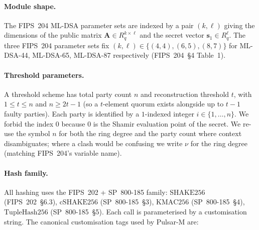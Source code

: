 \documentclass[11pt,a4paper]{article}
\theoremstyle{definition}
\theoremstyle{remark}
\newcommand{\Rq}{R_q}
\newcommand{\SHAKE}{\mathrm{SHAKE256}}
\newcommand{\cSHAKE}{\mathrm{cSHAKE256}}
\newcommand{\KMAC}{\mathrm{KMAC256}}
\newcommand{\TupleHash}{\mathrm{TupleHash256}}
\begin{document}
\paragraph{Module shape.} The FIPS~204 ML-DSA parameter sets are
indexed by a pair $(k, \ell)$ giving the dimensions of the public
matrix $\mathbf{A} \in \Rq^{k \times \ell}$ and the secret vector
$\mathbf{s}_1 \in \Rq^\ell$. The three FIPS~204 parameter sets fix
$(k, \ell) \in \{(4, 4), (6, 5), (8, 7)\}$ for ML-DSA-44, ML-DSA-65,
ML-DSA-87 respectively (FIPS~204~\S4 Table~1).

\paragraph{Threshold parameters.} A threshold scheme has total party
count $n$ and reconstruction threshold $t$, with $1 \le t \le n$ and
$n \ge 2t - 1$ (so a $t$-element quorum exists alongside up to $t-1$
faulty parties). Each party is identified by a $1$-indexed integer
$i \in \{1, \dots, n\}$. We forbid the index $0$ because $0$ is the
Shamir evaluation point of the secret. We re-use the symbol $n$ for
both the ring degree and the party count where context disambiguates;
where a clash would be confusing we write $\nu$ for the ring degree
(matching FIPS~204's variable name).

\paragraph{Hash family.} All hashing uses the FIPS~202 +
SP~800-185 family: $\SHAKE$ (FIPS~202~\S6.3), $\cSHAKE$
(SP~800-185~\S3), $\KMAC$ (SP~800-185~\S4), $\TupleHash$
(SP~800-185~\S5). Each call is parameterised by a customisation
string. The canonical customisation tags used by Pulsar-M are:
\end{document}

